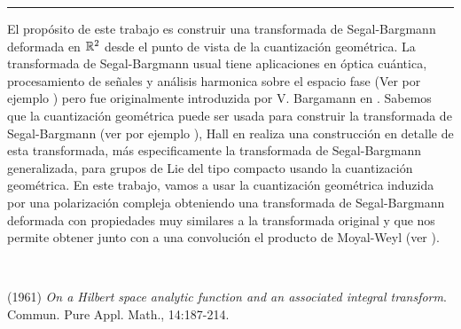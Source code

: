 \begin{titlepage}
\begin{minipage}{0.5\linewidth}
\begin{minipage}{0.45\linewidth}
    \begin{flushright}
        \printauthor
    \end{flushright}
\end{minipage} \hspace{0pt}
%
\begin{minipage}{0.02\linewidth}
      \color{ptctitle} \rule{1pt}{120pt}
\end{minipage} 
\end{minipage}
\hspace*{-4.5cm}
%
\begin{minipage}{0.85\linewidth}
\begin{minipage}{0.85\linewidth}
\footnotesize
\vspace{5pt}
    \begin{resumen}    
El prop\'osito de este trabajo es construir una transformada de Segal-Bargmann deformada en $\mathbb{R}^{2}$ desde el punto de vista de la cuantizaci\'on geom\'etrica. La transformada de Segal-Bargmann usual tiene aplicaciones en \'optica cu\'antica, procesamiento de se\~nales y an\'alisis harmonica sobre el espacio fase (Ver por ejemplo \cite{foll}) pero fue originalmente introduzida por V. Bargamann en \cite{bg}. Sabemos que la cuantizaci\'on geom\'etrica puede ser usada para construir la transformada de Segal-Bargmann (ver por ejemplo \cite{woo}), Hall  en \cite{hall} realiza una construcci\'on en detalle de esta transformada, m\'as especificamente la transformada de Segal-Bargmann generalizada, para grupos de Lie del tipo compacto usando la cuantizaci\'on geom\'etrica. En este trabajo, vamos a usar la cuantizaci\'on geom\'etrica induzida por una polarizaci\'on compleja obteniendo una transformada de Segal-Bargmann deformada con propiedades muy similares a la transformada original y que nos permite obtener junto con a una convoluci\'on el producto de Moyal-Weyl (ver \cite{jb}).
    \end{resumen}
   \end{minipage}
   \vspace{10pt}
\end{minipage}
\vspace{10pt}\\[5pt]
  \vspace{10pt}
\begin{thebibliography}{99}

 (1961) {\it On a Hilbert space analytic function and an associated integral transform}. Commun. Pure Appl. Math., 14:187-214.


\end{thebibliography}
\end{titlepage}
